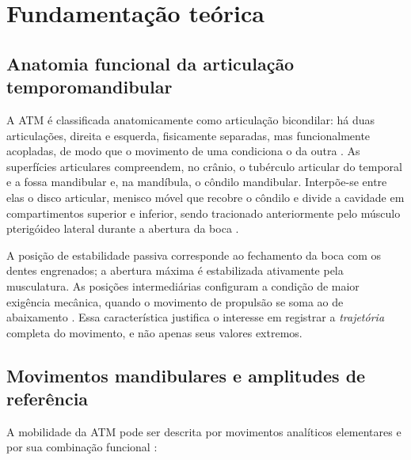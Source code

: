 \documentclass[
    article,
    11pt,
    oneside,
    a4paper,
    english,
    brazil
]{abntex2}
\begin{document}
\section{Fundamentação teórica}

\subsection{Anatomia funcional da articulação temporomandibular}

A ATM é classificada anatomicamente como articulação bicondilar: há duas
articulações, direita e esquerda, fisicamente separadas, mas
funcionalmente acopladas, de modo que o movimento de uma condiciona o da
outra \cite{dufour2016}. As superfícies articulares compreendem, no crânio,
o tubérculo articular do temporal e a fossa mandibular e, na mandíbula, o
côndilo mandibular. Interpõe-se entre elas o disco articular, menisco móvel
que recobre o côndilo e divide a cavidade em compartimentos superior e
inferior, sendo tracionado anteriormente pelo músculo pterigóideo lateral
durante a abertura da boca \cite{dufour2016}.

A posição de estabilidade passiva corresponde ao fechamento da boca com os
dentes engrenados; a abertura máxima é estabilizada ativamente pela
musculatura. As posições intermediárias configuram a condição de maior
exigência mecânica, quando o movimento de propulsão se soma ao de
abaixamento \cite{dufour2016}. Essa característica justifica o interesse em
registrar a \textit{trajetória} completa do movimento, e não apenas seus
valores extremos.

\subsection{Movimentos mandibulares e amplitudes de referência}

A mobilidade da ATM pode ser descrita por movimentos analíticos elementares
e por sua combinação funcional \cite{dufour2016}:
\end{document}
